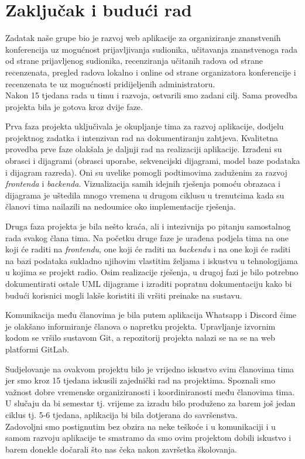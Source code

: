 \chapter{Zaključak i budući rad}
				
		 Zadatak naše grupe bio je razvoj web aplikacije za organiziranje znanstvenih konferencija uz mogućnost prijavljivanja sudionika, učitavanja znanstvenoga rada od strane prijavljenog sudionika, recenziranja učitanih radova od strane recenzenata, pregled radova lokalno i online od strane organizatora konferencije i recenzenata te uz mogućnosti pridijeljenih administratoru.\\
		 Nakon 15 tjedana rada u timu i razvoja, ostvarili smo zadani cilj. Sama provedba projekta bila je gotova kroz dvije faze.\par
		 		 
		 Prva faza projekta uključivala je okupljanje tima za razvoj aplikacije, dodjelu projektnog zadatka i intenzivan rad na dokumentiranju zahtjeva. Kvalitetna provedba prve faze olakšala je daljnji rad na realizaciji aplikacije.
		 Izrađeni su obrasci i dijagrami (obrasci uporabe, sekvencijski dijagrami, model baze podataka i dijagram razreda). Oni su uvelike pomogli podtimovima zaduženim za razvoj \textit{frontenda} i \textit{backenda}. Vizualizacija samih idejnih rješenja pomoću obrazaca i dijagrama je uštedila mnogo vremena u drugom ciklusu u trenutcima kada su članovi tima nailazili na nedoumice oko implementacije rješenja.\par
		 
		 Druga faza projekta je bila nešto kraća, ali i intezivnija po pitanju samostalnog rada svakog člana tima. Na početku druge faze je urađena podjela tima na one koji će raditi na \textit{frontendu}, one koji će raditi na \textit{backendu} i na one koji će raditi na bazi podataka sukladno njihovim vlastitim željama i iskustvu u tehnologijama u kojima se projekt radio. Osim realizacije rješenja, u drugoj fazi je bilo potrebno dokumentirati ostale UML dijagrame i izraditi popratnu dokumentaciju kako bi budući korisnici mogli lakše koristiti ili vršiti preinake na sustavu.\par
			
		 Komunikacija među članovima je bila putem aplikacija Whatsapp i Discord čime je olakšano informiranje članova o napretku projekta. Upravljanje izvornim kodom se vršilo sustavom Git, a repozitorij projekta nalazi se na se na web platformi GitLab.\par
		
		 Sudjelovanje na ovakvom projektu bilo je vrijedno iskustvo svim članovima tima jer smo kroz 15 tjedana iskusili zajednički rad na projektima. Spoznali smo važnost dobre vremenske organiziranosti i koordiniranosti među članovima tima. U slučaju da bi semestar tj. vrijeme za izradu bilo produženo za barem još jedan ciklus tj. 5-6 tjedana, aplikacija bi bila dotjerana do savršenstva.\\
		 Zadovoljni smo postignutim bez obzira na neke teškoće i u komunikaciji i u samom razvoju aplikacije te smatramo da smo ovim projektom dobili iskustvo i barem donekle dočarali što nas čeka nakon završetka školovanja.
		\eject 